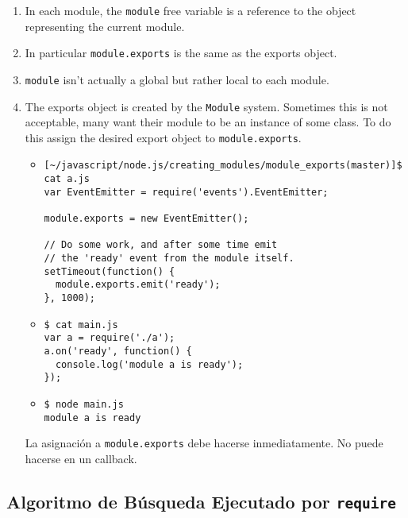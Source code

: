 \begin{enumerate}
\item
In each module, the \verb|module| free variable is a reference to the object
representing the current module. 

\item
In particular \verb|module.exports| is the
same as the exports object. 

\item
\verb|module| isn't actually a global but rather
local to each module.

\item
The exports object is created by the \verb|Module| system. 
Sometimes this is not acceptable, 
many want their module to be an instance of some class. 
To do this assign the desired export object to \verb|module.exports|. 

\begin{itemize}
\item
\begin{verbatim}
[~/javascript/node.js/creating_modules/module_exports(master)]$ cat a.js
var EventEmitter = require('events').EventEmitter;

module.exports = new EventEmitter();

// Do some work, and after some time emit
// the 'ready' event from the module itself.
setTimeout(function() {
  module.exports.emit('ready');
}, 1000);
\end{verbatim}

\item
\begin{verbatim}
$ cat main.js 
var a = require('./a');
a.on('ready', function() {
  console.log('module a is ready');
});
\end{verbatim}
\item
\begin{verbatim}
$ node main.js 
module a is ready
\end{verbatim}
\end{itemize}
La asignación a \verb|module.exports| debe hacerse inmediatamente. 
No puede hacerse en un callback.

\end{enumerate}

\subsection{Algoritmo de Búsqueda Ejecutado por {\tt require}}

